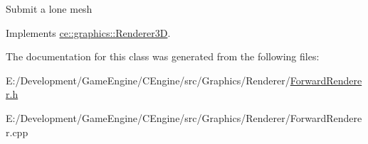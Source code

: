 Submit a lone mesh 

Implements \hyperlink{classce_1_1graphics_1_1_renderer3_d_aba7b0abfa0aad0d89a816923e83ef787}{ce\+::graphics\+::\+Renderer3D}.



The documentation for this class was generated from the following files\+:\begin{DoxyCompactItemize}
\item 
E\+:/\+Development/\+Game\+Engine/\+C\+Engine/src/\+Graphics/\+Renderer/\hyperlink{_forward_renderer_8h}{Forward\+Renderer.\+h}\item 
E\+:/\+Development/\+Game\+Engine/\+C\+Engine/src/\+Graphics/\+Renderer/Forward\+Renderer.\+cpp\end{DoxyCompactItemize}
